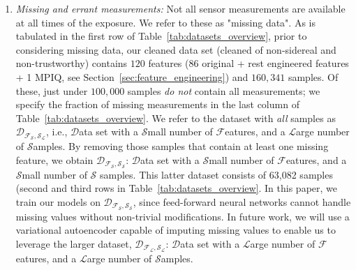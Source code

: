 \begin{enumerate}
    \item \textit{Missing and errant measurements:} Not all sensor measurements are available at all times of the exposure.  We refer to these as "missing data". As is tabulated in the first row of Table~\ref{tab:datasets_overview}, prior to considering missing data, our cleaned data set (cleaned of non-sidereal and non-trustworthy) contains $120$ features ($86$ original + rest engineered features + 1 MPIQ, see Section~\ref{sec:feature_engineering}) and $160,341$ samples. Of these, just under $100,000$ samples \textit{do not} contain all measurements; we specify the fraction of missing measurements in the last column of Table~\ref{tab:datasets_overview}. We refer to the dataset with {\it all} samples as $\mathcal{D_{F_S,S_L}}$, i.e., $\mathcal{D}$ata set with a $\mathcal{S}$mall number of $\mathcal{F}$eatures, and a $\mathcal{L}$arge number of $\mathcal{S}$amples. By removing those samples that contain at least one missing feature, we obtain $\mathcal{D_{F_S,S_S}}$: $\mathcal{D}$ata set with a $\mathcal{S}$mall number of $\mathcal{F}$eatures, and a $\mathcal{S}$mall number of $\mathcal{S}$ samples. This latter dataset consists of 63,082 samples (second and third rows in Table~\ref{tab:datasets_overview}. %
    In this paper, we train our models on $\mathcal{D_{F_S,S_S}}$, since feed-forward neural networks cannot handle missing values without non-trivial modifications. In future work, we will use a variational autoencoder capable of imputing missing values \citep{vae_missingvalues} to enable us to leverage the larger dataset, $\mathcal{D_{F_L,S_L}}$: $\mathcal{D}$ata set with a $\mathcal{L}$arge number of $\mathcal{F}$eatures, and a $\mathcal{L}$arge number of $\mathcal{S}$amples.


\end{enumerate}
